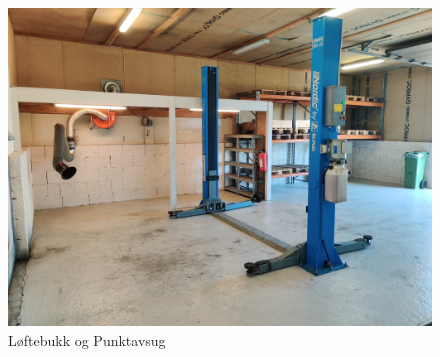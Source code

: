         \begin{figure}[H]
            \centering
            \includegraphics[width=1\textwidth]{Img/Loftebukk_Og_Punktavsug.JPG}
            \caption{Løftebukk og Punktavsug}
            \label{fig:L_og_P}
        \end{figure}
